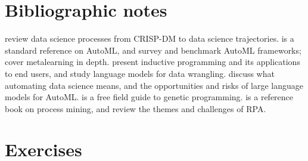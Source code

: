 \section*{Bibliographic notes}

\citet{martinezplumed2021crisp} review data science processes from CRISP-DM to data science trajectories.
\citet{hutter2019automated} is a standard reference on AutoML, and \citet{zoller2021benchmark} survey and
benchmark AutoML frameworks; \citet{brazdil2022metalearning} cover metalearning in depth.
\citet{gulwani2015inductive} present inductive programming and its applications to end users, and
\citet{jaimovitch2023can} study language models for data wrangling. \citet{debie2022automating} discuss what automating
data science means, and \citet{tornede2024automl} the opportunities and risks of large language models for AutoML. \citet{poli2008field} is a free field
guide to genetic programming. \citet{vanderaalst2016process} is a reference book on process mining, and
\citet{syed2020robotic} review the themes and challenges of RPA.

\section*{Exercises}

